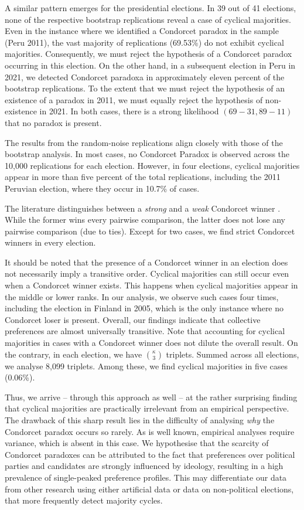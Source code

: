 \documentclass[12pt]{scrartcl}
\newcommand{\nbpresidential}{41 }
\begin{document}
A similar pattern emerges for the presidential elections. In 
39 out of \nbpresidential elections, none of the respective bootstrap replications reveal a case of cyclical majorities. Even in the instance where we identified a Condorcet paradox in the sample (Peru 2011), the vast majority of replications (69.53\%) do not exhibit cyclical majorities. Consequently, we must reject the hypothesis of a Condorcet paradox occurring in this election. On the other hand, in a subsequent election in Peru in 2021, we detected Condorcet paradoxa in approximately eleven percent of the bootstrap replications. To the extent that we must reject the hypothesis of an existence of a paradox in 2011, we must equally reject the hypothesis of non-existence in 2021. In both cases, there is a strong likelihood $(69-31, 89-11)$ that no paradox is present.

The results from the random-noise replications align closely with those of the bootstrap analysis. In most cases, no Condorcet Paradox is observed across the 10,000 replications for each election. However, in four elections, cyclical majorities appear in more than five percent of the total replications, including the 2011 Peruvian election, where they occur in 10.7\% of cases.


The literature distinguishes between a \textit{strong} and a \textit{weak} Condorcet winner \citep{Barbera2023}. While the former wins every pairwise comparison, the latter does not lose any pairwise comparison (due to ties). Except for two cases, we find strict Condorcet winners in every election.

It should be noted that the presence of a Condorcet winner in an election does not necessarily imply a transitive order. Cyclical majorities can still occur even when a Condorcet winner exists. This happens when cyclical majorities appear in the middle or lower ranks. In our analysis, we observe such cases four times, including the election in Finland in 2005, which is the only instance where no Condorcet loser is present. Overall, our findings indicate that collective preferences are almost universally transitive. Note that accounting for cyclical majorities in cases with a Condorcet winner does not dilute the overall result. On the contrary, in each election, we have $\binom{\kappa}{3}$ triplets. Summed across all elections, we analyse 8,099 triplets. Among these, we find cyclical majorities in five cases (0.06\%).

Thus, we arrive -- through this approach as well -- at the rather surprising finding that cyclical majorities are practically irrelevant from an empirical perspective. The drawback of this sharp result lies in the difficulty of analysing \emph{why} the Condorcet paradox occurs so rarely. As is well known, empirical analyses require variance, which is absent in this case. We hypothesise that the scarcity of Condorcet paradoxes can be attributed to the fact that preferences over political parties and candidates are strongly influenced by ideology, resulting in a high prevalence of single-peaked preference profiles. This may differentiate our data from other research using either artificial data or data on non-political elections, that more frequently detect majority cycles.
\end{document}
